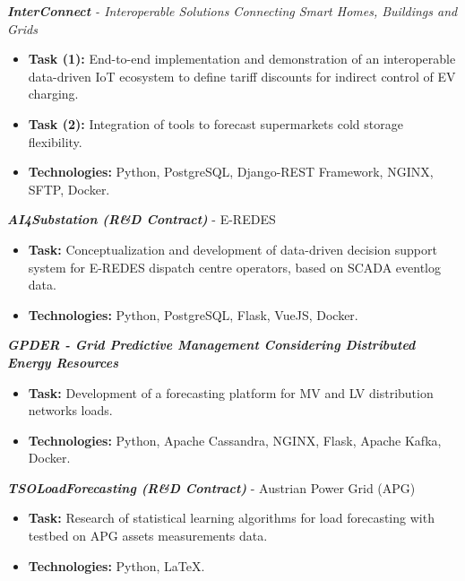 \documentclass{mycv}
\begin{document}
{\begin{myitemize}
	
	\item \textit{\textbf{InterConnect} - Interoperable Solutions Connecting Smart Homes, Buildings and Grids}
	\begin{itemize}
		\item \textbf{Task (1):} End-to-end implementation and demonstration of an interoperable data-driven IoT ecosystem to define tariff discounts for indirect control of EV charging.
		\item \textbf{Task (2):} Integration of tools to forecast supermarkets cold storage flexibility.
		\item \textbf{Technologies:} Python, PostgreSQL, Django-REST Framework, NGINX, SFTP, Docker.
	\end{itemize}
	
	
	\vspace{0.15cm}	
	\item \textit{\textbf{AI4Substation (R\&D Contract)}} - E-REDES
	\begin{itemize}
		\item \textbf{Task:} Conceptualization and development of data-driven decision support system for E-REDES dispatch centre operators, based on SCADA eventlog data.
		\item \textbf{Technologies:} Python, PostgreSQL, Flask, VueJS, Docker.
	\end{itemize}
	
	\vspace{0.15cm}	
	\item \textit{\textbf{GPDER - Grid Predictive Management Considering Distributed Energy Resources}}
	\begin{itemize}
		\item \textbf{Task:} Development of a forecasting platform for MV and LV distribution networks loads.
		\item \textbf{Technologies:} Python, Apache Cassandra, NGINX, Flask, Apache Kafka, Docker.
	\end{itemize}
	
	\vspace{0.15cm}	
	\item \textit{\textbf{TSOLoadForecasting (R\&D Contract)}} - Austrian Power Grid (APG)
	\begin{itemize}
		\item \textbf{Task:} Research of statistical learning algorithms for load forecasting with  testbed on APG assets measurements data.
		\item \textbf{Technologies:} Python, \LaTeX.
	\end{itemize}
	

\end{myitemize}}
\end{document}
